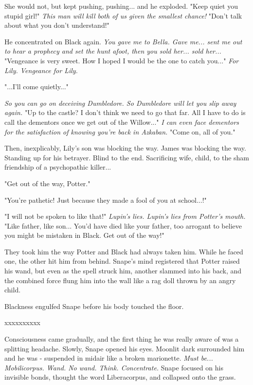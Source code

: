 \documentclass[a4paper,11pt]{article}
\begin{document}
She would not, but kept pushing, pushing... and he exploded. "Keep quiet you stupid girl!" \emph{This man will kill both of us given the smallest chance!} "Don't talk about what you don't understand!"

He concentrated on Black again. \emph{You gave me to Bella. Gave me... sent me out to hear a prophecy and set the hunt afoot, then you sold her... sold her...} "Vengeance is very sweet. How I hoped I would be the one to catch you..." \emph{For Lily. Vengeance for Lily.}

"...I'll come quietly..."

\emph{So you can go on deceiving Dumbledore. So Dumbledore will let you slip away again. }"Up to the castle? I don't think we need to go that far. All I have to do is call the dementors once we get out of the Willow..." \emph{I can even face dementors for the satisfaction of knowing you're back in Azkaban.} "Come on, all of you."

Then, inexplicably, Lily's son was blocking the way. James was blocking the way. Standing up for his betrayer. Blind to the end. Sacrificing wife, child, to the sham friendship of a psychopathic killer...

"Get out of the way, Potter."

"You're pathetic! Just because they made a fool of you at school...!"

"I will not be spoken to like that!" \emph{Lupin's lies. Lupin's lies from Potter's mouth.} "Like father, like son... You'd have died like your father, too arrogant to believe you might be mistaken in Black. Get out of the way!"

They took him the way Potter and Black had always taken him. While he faced one, the other hit him from behind. Snape's mind registered that Potter raised his wand, but even as the spell struck him, another slammed into his back, and the combined force flung him into the wall like a rag doll thrown by an angry child.

Blackness engulfed Snape before his body touched the floor.

xxxxxxxxxx

Consciousness came gradually, and the first thing he was really aware of was a splitting headache. Slowly, Snape opened his eyes. Moonlit dark surrounded him and he was - suspended in midair like a broken marionette. \emph{Must be... Mobilicorpus. Wand. No wand. Think. Concentrate.} Snape focused on his invisible bonds, thought the word Liberacorpus, and collapsed onto the grass.
\end{document}
